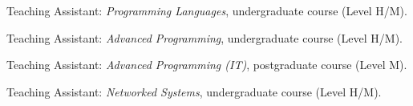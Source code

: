 \clearpage
{}
\begin{cvitemize}[2016--2017]
	\item Teaching Assistant: \emph{Programming Languages}, undergraduate course (Level H/M).
	\item Teaching Assistant: \emph{Advanced Programming}, undergraduate course (Level H/M).
	\item Teaching Assistant: \emph{Advanced Programming (IT)}, postgraduate course (Level M).
	\item Teaching Assistant: \emph{Networked Systems}, undergraduate course (Level H/M).
\end{cvitemize}